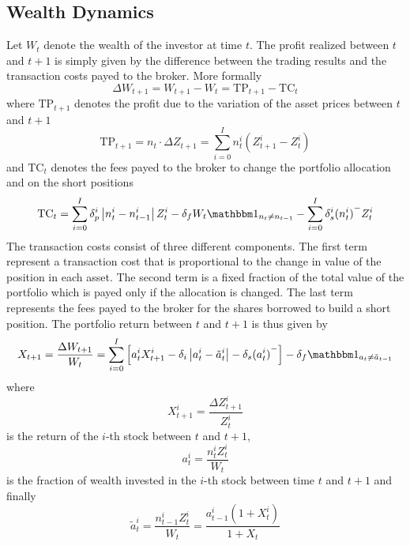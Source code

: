 \subsection{Wealth Dynamics}
Let $W_t$ denote the wealth of the investor at time $t$. The profit realized between $t$ and $t+1$ is simply given by the difference between the trading results and the transaction costs payed to the broker. More formally
\begin{equation*}
	\Delta W_{t+1} = W_{t+1} - W_t = \text{TP}_{t+1} - \text{TC}_{t}	
\end{equation*}
where $\text{TP}_{t+1}$ denotes the profit due to the variation of the asset prices between $t$ and $t+1$
\begin{equation*}
	\text{TP}_{t+1} = {n}_t \cdot \Delta{Z}_{t+1} = \sum^{I}_{i=0} 
	n_t^i (Z_{t+1}^i - Z_t^i) 
\end{equation*}
and $\text{TC}_t$ denotes the fees payed to the broker to change the portfolio
allocation and on the short positions
\begin{equation*}
	\text{TC}_t = \sum^{I}_{i=0} \delta_p^i \left| n_t^i - n_{t-1}^i\right| Z_t^i 
				- \delta_f W_t \ind{{n}_t \neq {n}_{t-1}} 
				- \sum^{I}_{i=0} \delta_s^i {(n_t^i)}^{-} Z_t^i
\end{equation*}
The transaction costs consist of three different components. The first term 
represent a transaction cost that is proportional to the change in value of the 
position in each asset. The second term is a fixed fraction of the total value
of the portfolio which is payed only if the allocation is changed. The last
term represents the fees payed to the broker for the shares borrowed to build a
short position. The portfolio return between $t$ and $t+1$ is thus given by
\begin{equation}\label{eq:portfolio_return}
	X_{t+1} = \frac{\Delta W_{t+1}}{W_t} = \sum^{I}_{i=0} \left[ a_t^i
	X_{t+1}^i - \delta_i \left| a_t^i - \tilde{a}_t^i \right| - \delta_s
	{(a_t^i)}^- \right] - \delta_f \ind{{a}_t \neq \tilde{{a}}_{t-1}}  
\end{equation}
where 
\begin{equation*}
	X_{t+1}^i = \frac{\Delta Z_{t+1}^i}{Z_t^i}
\end{equation*}
is the return of the $i$-th stock between $t$ and $t+1$, 
\begin{equation*}
	a_t^i = \frac{n_t^i Z_t^i}{W_t}
\end{equation*}
is the fraction of wealth invested in the $i$-th stock between time $t$ and
$t+1$ and finally 
\begin{equation*}
	\tilde{a}_t^i = \frac{n_{t-1}^i Z_t^i}{W_t} = \frac{a_{t-1}^i (1+X_t^i)}
	{1 + X_t}
\end{equation*}
